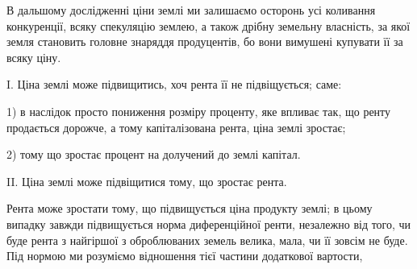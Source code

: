 В дальшому дослідженні ціни землі ми залишаємо осторонь усі коливання
конкуренції, всяку спекуляцію землею, а також дрібну земельну власність, за
якої земля становить головне знаряддя продуцентів, бо вони вимушені купувати її
за всяку ціну.

I. Ціна землі може підвищитись, хоч рента її не підвіщується; саме:

1) в наслідок просто пониження розміру проценту, яке впливає так, що
ренту продається дорожче, а тому капіталізована рента, ціна землі зростає;

2) тому що зростає процент на долучений до землі капітал.

II. Ціна землі може підвіщитися тому, що зростає рента.

Рента може зростати тому, що підвищується ціна продукту землі; в цьому
випадку завжди підвищується норма диференційної ренти, незалежно від того,
чи буде рента з найгіршої з оброблюваних земель велика, мала, чи її зовсім
не буде. Під нормою ми розуміємо відношення тієї частини додаткової вартости,
\parbreak{}  %
